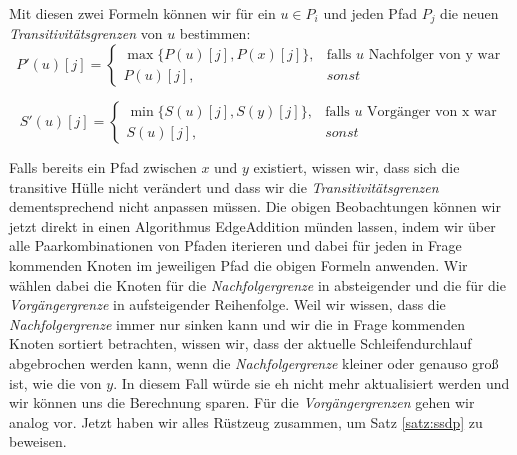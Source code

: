 Mit diesen zwei Formeln können wir für ein $u \in P_i$ und jeden Pfad $P_j$ die neuen \emph{Transitivitätsgrenzen} von $u$ bestimmen:
\begin{equation}
	P'(u)[j] = \begin{cases}
			\max\{P(u)[j], P(x)[j]\}, & \text{falls $u$ Nachfolger von y war} \\
			P(u)[j], & sonst
		\end{cases}
\end{equation} 

\begin{equation}
	S'(u)[j] = \begin{cases}
			\min\{S(u)[j], S(y)[j]\}, & \text{falls $u$ Vorgänger von x war} \\
			S(u)[j], & sonst
		\end{cases}
\end{equation}

Falls bereits ein Pfad zwischen $x$ und $y$ existiert, wissen wir, dass sich die transitive Hülle nicht verändert und dass wir die \emph{Transitivitätsgrenzen} dementsprechend nicht anpassen müssen. Die obigen Beobachtungen können wir jetzt direkt in einen Algorithmus \textrm{EdgeAddition} münden lassen, indem wir über alle Paarkombinationen von Pfaden iterieren und dabei für jeden in Frage kommenden Knoten im jeweiligen Pfad die obigen Formeln anwenden. Wir wählen dabei die Knoten für die \emph{Nachfolgergrenze} in absteigender und die für die \emph{Vorgängergrenze} in aufsteigender Reihenfolge. Weil wir wissen, dass die \emph{Nachfolgergrenze} immer nur sinken kann und wir die in Frage kommenden Knoten sortiert betrachten, wissen wir, dass der aktuelle Schleifendurchlauf abgebrochen werden kann, wenn die \emph{Nachfolgergrenze} kleiner oder genauso groß ist, wie die von $y$. In diesem Fall würde sie eh nicht mehr aktualisiert werden und wir können uns die Berechnung sparen. Für die \emph{Vorgängergrenzen} gehen wir analog vor. Jetzt haben wir alles Rüstzeug zusammen, um Satz \ref{satz:ssdp} zu beweisen.

